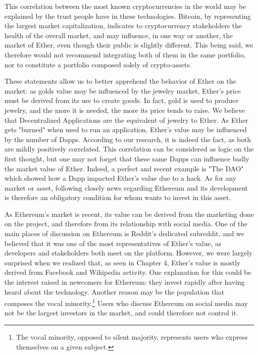 \documentclass[11pt]{report}
\begin{document}
This correlation between the most known cryptocurrencies in the world may be explained by the trust people have in these technologies. Bitcoin, by representing the largest market capitalization, indicates to cryptocurrency stakeholders the health of the overall market, and may influence, in one way or another, the market of Ether, even though their public is slightly different. This being said, we therefore would not recommend integrating both of them in the same portfolio, nor to constitute a portfolio composed solely of crypto-assets.\clearpage
 
 These statements allow us to better apprehend the behavior of Ether on the market: as golds value may be influenced by the jewelry market, Ether's price must be derived from its use to create goods. In fact, gold is used to produce jewelry, and the more it is needed, the more its price tends to raise. We believe that Decentralized Applications are the equivalent of jewelry to Ether. As Ether gets "burned" when used to run an application, Ether's value may be influenced by the number of Dapps. According to our research, it is indeed the fact, as both are mildly positively correlated. This correlation can be considered as logic on the first thought, but one may not forget that these same Dapps can influence badly the market value of Ether. Indeed, a perfect and recent example is "The DAO" which showed how a Dapp impacted Ether's value due to a hack. As for any market or asset, following closely news regarding Ethereum and its development is therefore an obligatory condition for whom wants to invest in this asset.\newline
 
As Ethereum's market is recent, its value can be derived from the marketing done on the project, and therefore from its relationship with social media. One of the main places of discussion on Ethereum is Reddit's dedicated subreddit, and we believed that it was one of the most representatives of Ether's value, as developers and stakeholders both meet on the platform. However, we were largely surprised when we realized that, as seen in Chapter 4, Ether's value is mostly derived from Facebook and Wikipedia activity. 
One explanation for this could be the interest raised in newcomers for Ethereum: they invest rapidly after having heard about the technology. Another reason may be the population that composes the vocal minority.\footnote{The vocal minority, opposed to silent majority, represents users who express themselves on a given subject.} Users who discuss Ethereum on social media may not be the largest investors in the market, and could therefore not control it.\newline
\end{document}
